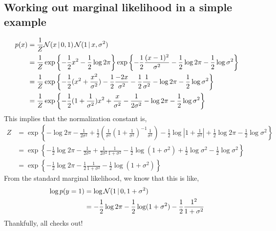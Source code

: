 \documentclass{article}
\begin{document}
\appendix

\subsection*{Working out marginal likelihood in a simple example}
\begin{align}
  p(x) &= \frac{1}{Z} \mathcal{N}(x \,|\, 0, 1) \, \mathcal{N}(1 \,|\, x, \sigma^2) \\
  &= \frac{1}{Z}
  \exp \left \{ -\frac{1}{2} x^2 -\frac{1}{2} \log 2 \pi \right \}
  \exp \left \{ -\frac{1}{2} \frac{(x-1)^2}{\sigma^2}  -\frac{1}{2} \log 2 \pi -\frac{1}{2} \log \sigma^2 \right \} \\
  &= \frac{1}{Z} \exp \left \{ -\frac{1}{2} (x^2 + \frac{x^2}{\sigma^2}) -\frac{1}{2} \frac{-2x}{\sigma^2} -\frac{1}{2}\frac{1}{\sigma^2}  - \log 2 \pi  -\frac{1}{2} \log \sigma^2 \right \} \\
  &= \frac{1}{Z} \exp \left \{ -\frac{1}{2} (1 + \frac{1}{\sigma^2}) x^2 + \frac{x}{\sigma^2} -\frac{1}{2\sigma^2}  - \log 2 \pi  -\frac{1}{2} \log \sigma^2 \right \}
\end{align}
This implies that the normalization constant is,
\begin{align}
  Z &= \exp \left \{  - \log 2 \pi -\frac{1}{2\sigma^2} + \frac{1}{2} (\frac{1}{\sigma^2}(1+\frac{1}{\sigma^2})^{-1} \frac{1}{\sigma^2}) - \frac{1}{2} \log |1+\frac{1}{\sigma^2}| + \frac{1}{2} \log 2 \pi -\frac{1}{2} \log \sigma^2\right \} \\
  &= \exp \left \{ -\frac{1}{2} \log 2 \pi - \frac{1}{2\sigma^2} + \frac{1}{2\sigma^2} \frac{1}{1+\sigma^2} - \frac{1}{2} \log(1+\sigma^2) + \frac{1}{2}\log \sigma^2 -\frac{1}{2} \log \sigma^2\right \}\\
  &= \exp \left \{ -\frac{1}{2} \log 2 \pi - \frac{1}{2}  \frac{1}{1+\sigma^2} - \frac{1}{2} \log(1+\sigma^2) \right \}
\end{align}
From the standard marginal likelihood, we know that this is like,
\begin{align}
  \log p(y=1) &= \log \mathcal{N}(1 \,|\, 0, 1 + \sigma^2) \\
  &= -\frac{1}{2} \log 2 \pi -\frac{1}{2} \log (1+\sigma^2) - \frac{1}{2} \frac{1^2}{1+\sigma^2} \\
\end{align}
Thankfully, all checks out!
\end{document}
